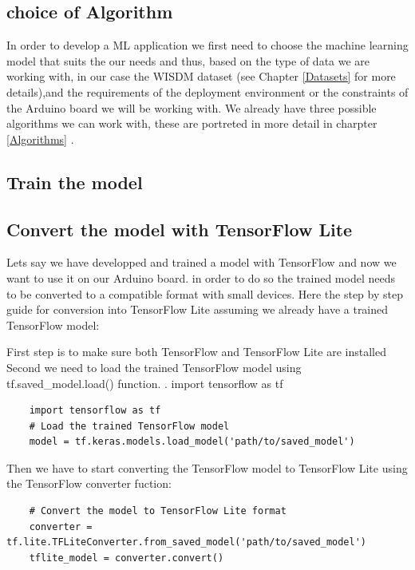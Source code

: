 \subsection{choice of Algorithm}
In order to develop a ML application we first need to choose the machine learning model that suits the our needs and thus, based on the type of data we are working with, in our case the WISDM dataset (see Chapter \ref{Datasets} for more details),and the requirements of the deployment environment or the constraints of the Arduino board we will be working with. 
We already have three possible algorithms we can work with, these are portreted in more detail in charpter \ref{Algorithms} .
\subsection{Train the model}


\subsection{Convert the model with TensorFlow Lite}
\label{Convert the model with TensorFlow Lite}


Lets say we have developped and trained a model with TensorFlow and now we want to use it on our Arduino board.
in order to do so the trained model needs to be converted to a compatible format with small devices. 
Here the step by step guide for conversion into TensorFlow Lite assuming we already have a trained TensorFlow model:

First step is to make sure both TensorFlow and TensorFlow Lite are installed 
Second we need to load the trained TensorFlow model using tf.saved\_model.load() function. .
import tensorflow as tf
\lstset{language=Python}
\begin{verbatim}
	import tensorflow as tf
	# Load the trained TensorFlow model
	model = tf.keras.models.load_model('path/to/saved_model')
\end{verbatim}

Then we have to start converting the TensorFlow model to TensorFlow Lite using the TensorFlow converter fuction: 


\begin{verbatim}
	# Convert the model to TensorFlow Lite format
	converter = tf.lite.TFLiteConverter.from_saved_model('path/to/saved_model')
	tflite_model = converter.convert()
\end{verbatim}


